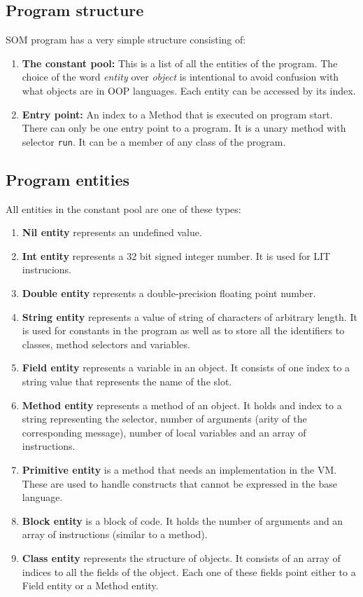 \documentclass[thesis=M,english]{FITthesis}[2019/12/23]
\begin{document}
\subsection{Program structure}
SOM program has a very simple structure consisting of:
\begin{enumerate}
	\item \textbf{The constant pool:} This is a list of all the entities of the program. The choice of the word \textit{entity}
		over \textit{object} is intentional to avoid confusion with what objects are in OOP languages. Each entity can be accessed
		by its index.
	\item \textbf{Entry point: } An index to a Method that is executed on program start. There can only be one entry point to a
		program. It is a unary method with selector \texttt{run}. It can be a member of any class of the program.  
\end{enumerate}

\subsection{Program entities}
All entities in the constant pool are one of these types:
\begin{enumerate}
	\item \textbf{Nil entity} represents an undefined value.
	\item \textbf{Int entity} represents a 32 bit signed integer number. It is used for LIT instrucions.
	\item \textbf{Double entity} represents a double-precision floating point number.
	\item \textbf{String entity} represents a value of string of characters of arbitrary length. It is used for
		constants in the program as well as to store all the identifiers to classes, method selectors and variables.
	\item \textbf{Field entity} represents a variable in an object. It consists of one index to a string value that represents
		the name of the slot.
	\item \textbf{Method entity} represents a method of an object. It holds and index to a string representing the selector,
		number of arguments (arity of the corresponding message), number of local variables and an array of instructions.
	\item \textbf{Primitive entity} is a method that needs an implementation in the VM. These are used to handle constructs that
		cannot be expressed in the base language. 
	\item \textbf{Block entity} is a block of code. It holds the number of arguments and an array of instructions (similar
		to a method).
	\item \textbf{Class entity} represents the structure of objects. It consists of an array of indices to all the fields
		of the object. Each one of these fields point either to a Field entity or a Method entity.
\end{enumerate}
\end{document}
